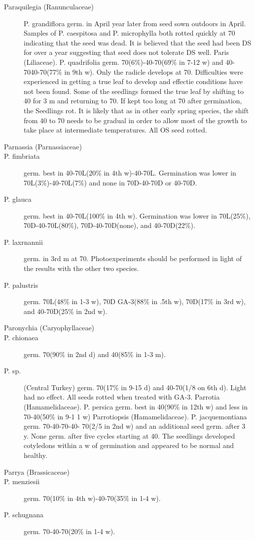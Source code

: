 \begin{description}
\item[Paraquilegia (Ranunculaceae)] P. grandiflora germ. in April year later
from seed sown outdoors in April. Samples of P. caespitosa and P. microphylla both
rotted quickly at 70 indicating that the seed was dead. It is believed that the seed had
been DS for over a year suggesting that seed does not tolerate DS well.
Paris (Liliaceae). P. quadrifolia germ. 70(6\%)-40-70(69\% in 7-12 w) and 40-
7040-70(77\% in 9th w). Only the radicle develops at 70. Difficulties were
experienced in getting a true leaf to develop and effectie conditions have not been
found. Some of the seedlings formed the true leaf by shifting to 40 for 3 m and
returning to 70. If kept too long at 70 after germination, the Seedlings rot. It is likely
that as in other early spring species, the shift from 40 to 70 needs to be gradual in
order to allow most of the growth to take place at intermediate temperatures. All OS
seed rotted.

\item[Parnassia (Parnassiaceae)]
\item[P. fimbriata] germ. best in 40-70L(20\% in 4th w)-40-70L. Germination was lower
in 70L(3\%)-40-70L(7\%) and none in 70D-40-70D or 40-70D.
\item[P. glauca] germ. best in 40-70L(100\% in 4th w). Germination was lower in
70L(25\%), 70D-40-70L(80\%), 70D-40-70D(none), and 40-70D(22\%).
\item[P. laxrnannii] germ. in 3rd m at 70. Photoexperiments should be performed in
light of the results with the other two species.
\item[P. palustris] germ. 70L(48\% in 1-3 w), 70D GA-3(88\% in .5th w), 70D(17\% in 3rd
w), and 40-70D(25\% in 2nd w).

\item[Paronychia (Caryophyllaceae)]
\item[P. chionaea] germ. 70(90\% in 2nd d) and 40(85\% in 1-3 m).
\item[P. sp.] (Central Turkey) germ. 70(17\% in 9-15 d) and 40-70(1/8 on 6th d). Light
had no effect. All seeds rotted when treated with GA-3.
Parrotia (Hamamelidaceae). P. persica germ. best in 40(90\% in 12th w)
and less in 70-40(50\% in 9-1 1 w)
Parrotiopsis (Hamamelidaceae). P. jacquemontiana germ. 70-40-70-40-
70(2/5 in 2nd w) and an additional seed germ. after 3 y. None germ. after five cycles
starting at 40. The seedlings developed cotyledons within a w of germination and
appeared to be normal and healthy.

\item[Parrya (Brassicaceae)]
\item[P. menziesii] germ. 70(10\% in 4th w)-40-70(35\% in 1-4 w).
\item[P. schugnana] germ. 70-40-70(20\% in 1-4 w).


\end{description}

